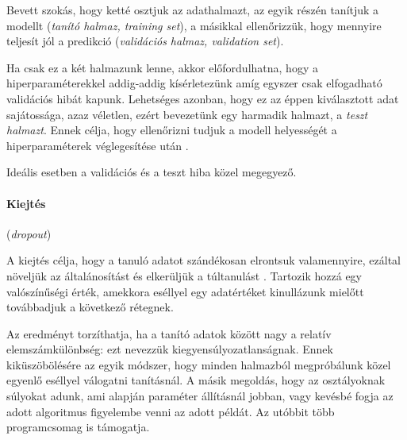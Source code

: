 
Bevett szokás, hogy ketté osztjuk az adathalmazt, az egyik részén tanítjuk a modellt (\textit{tanító halmaz, training set}), a másikkal ellenőrizzük, hogy mennyire teljesít jól a predikció (\textit{validációs halmaz, validation set}).

Ha csak ez a két halmazunk lenne, akkor előfordulhatna, hogy a hiperparaméterekkel addig-addig kísérletezünk amíg egyszer csak elfogadható validációs hibát kapunk. 
Lehetséges azonban, hogy ez az éppen kiválasztott adat sajátossága, azaz véletlen, ezért bevezetünk egy harmadik halmazt, a \textit{teszt halmazt}. Ennek célja, hogy ellenőrizni tudjuk a modell helyességét a hiperparaméterek véglegesítése után \cite{earlystopping}.





Ideális esetben a validációs és a teszt hiba közel megegyező.


\paragraph{Kiejtés} (\textit{dropout})


A kiejtés célja, hogy a tanuló adatot szándékosan elrontsuk valamennyire, ezáltal növeljük az általánosítást és elkerüljük a túltanulást \cite{earlystopping}. Tartozik hozzá egy valószínűségi érték, amekkora eséllyel egy adatértéket kinullázunk mielőtt továbbadjuk a következő rétegnek.



Az eredményt torzíthatja, ha a tanító adatok között
nagy a relatív elemszámkülönbség: ezt nevezzük kiegyensúlyozatlanságnak.
Ennek kiküszöbölésére az egyik módszer, hogy minden halmazból 
megpróbálunk közel egyenlő eséllyel válogatni tanításnál. A másik megoldás, hogy az 
osztályoknak súlyokat adunk,
ami alapján paraméter állításnál jobban, vagy kevésbé fogja
az adott algoritmus figyelembe venni az adott példát. Az utóbbit több programcsomag is támogatja.

